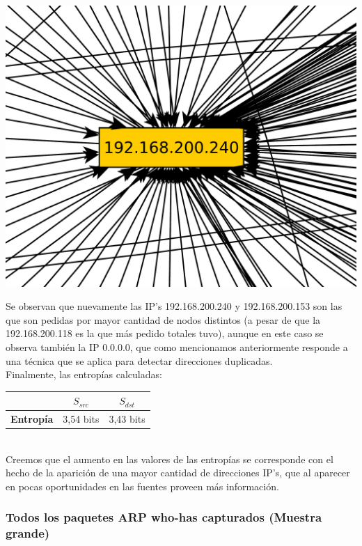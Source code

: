 \includegraphics[scale=0.3,clip=true,trim=20 0 0 0]{graphics/laburomediano254.pdf}


\indent Se observan que nuevamente las IP's 192.168.200.240 y 192.168.200.153 son las que son pedidas por mayor cantidad de nodos distintos (a pesar de que la 192.168.200.118 es la que más pedido totales tuvo), aunque en este caso se observa también la IP 0.0.0.0, que como mencionamos anteriormente responde a una técnica que se aplica para detectar direcciones duplicadas.\\

\indent Finalmente, las entropías calculadas:\\

\begin{centering}
	\begin{tabular}{ | c | c | c |} \hline
	   & \textbf{$S_{src}$} & \textbf{$S_{dst}$} \\ \hline
	  	\textbf{Entropía} & 3,54 bits & 3,43 bits \\ \hline
	\end{tabular}
\end{centering}\\


\indent Creemos que el aumento en las valores de las entropías se corresponde con el hecho de la aparición de una mayor cantidad de direcciones IP's, que al aparecer en pocas oportunidades en las fuentes proveen más información.\\


\subsubsection{Todos los paquetes ARP who-has capturados (Muestra grande)}

